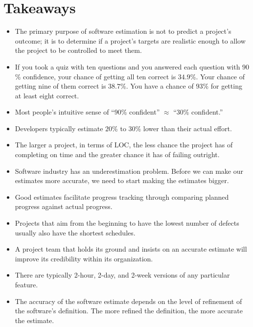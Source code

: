 \documentclass[12pt]{article}
\begin{document}
\section*{Takeaways}
\begin{itemize}
\item The primary purpose of software estimation is not to predict a project's outcome; it is to determine if a project's targets are realistic enough to allow the project to be controlled to meet them.

\item If you took a quiz with ten questions and you answered each question with $90$\% confidence, your chance of getting all ten correct is $34.9$\%. Your chance of getting nine of them correct is $38.7$\%. You have a chance of $93$\% for getting at least eight correct.

\item Most people's intuitive sense of ``$90$\% confident'' $\approx$ ``$30$\% confident.''

\item Developers typically estimate $20$\% to $30$\% lower than their actual effort.

\item The larger a project, in terms of LOC, the less chance the project has of completing on time and the greater chance it has of failing outright.

\item Software industry has an underestimation problem. Before we can make our estimates more accurate, we need to start making the estimates bigger.

\item Good estimates facilitate progress tracking through comparing planned progress against actual progress.

\item Projects that aim from the beginning to have the lowest number of defects usually also have the shortest schedules.

\item A project team that holds its ground and insists on an accurate estimate will improve its credibility within its organization.

\item There are typically 2-hour, 2-day, and 2-week versions of any particular feature.

\item The accuracy of the software estimate depends on the level of refinement of the software's definition. The more refined the definition, the more accurate the estimate.


\end{itemize}
\end{document}
